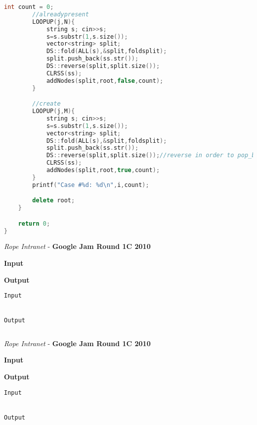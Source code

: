 \begin{solution}
\begin{lstlisting}[language=c++, caption="File fix it c++ solution"]
        int count = 0;
        //alreadypresent
        LOOPUP(j,N){
            string s; cin>>s;
            s=s.substr(1,s.size());
            vector<string> split;
            DS::fold(ALL(s),&split,foldsplit);
            split.push_back(ss.str());
            DS::reverse(split,split.size());
            CLRSS(ss);
            addNodes(split,root,false,count);
        }

        //create
        LOOPUP(j,M){
            string s; cin>>s;
            s=s.substr(1,s.size());
            vector<string> split;
            DS::fold(ALL(s),&split,foldsplit);
            split.push_back(ss.str());
            DS::reverse(split,split.size());//reverse in order to pop_back efficently
            CLRSS(ss);
            addNodes(split,root,true,count);
        }
        printf("Case #%d: %d\n",i,count);

        delete root;
    }

    return 0;
}

	\end{lstlisting}
\end{solution}

\begin{problem}{\textit{Rope Intranet} - \textbf{Google Jam Round 1C 2010}}




\textbf{Input}


\textbf{Output}


\begin{framed}
	\begin{verbatim}
Input 


Output 

	\end{verbatim}
\end{framed}

\end{problem}

\begin{solution}
	
	\begin{lstlisting}[language=c++, caption="Store credit c++ solution"]


	\end{lstlisting}
\end{solution}



\begin{problem}{\textit{Rope Intranet} - \textbf{Google Jam Round 1C 2010}}




\textbf{Input}


\textbf{Output}


\begin{framed}
	\begin{verbatim}
Input 


Output 

	\end{verbatim}
\end{framed}

\end{problem}

